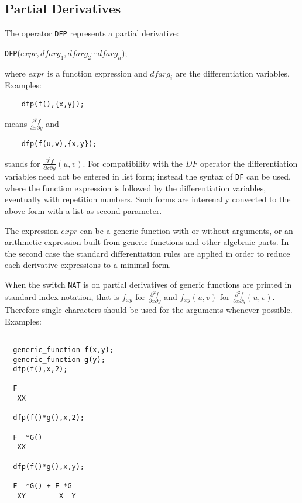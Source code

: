 \subsection{Partial Derivatives}

The operator {\tt DFP} represents a partial derivative:

\vspace{.1in}
 {\tt DFP}($expr,{dfarg_1,dfarg_2\cdots dfarg_n}$);
\vspace{.1in}

\noindent
where $expr$ is a function expression and $dfarg_i$ are
the differentiation variables. Examples:

\begin{verbatim}
    dfp(f(),{x,y});
\end{verbatim}
means $\frac{\partial ^2 f}{\partial x \partial y}$ and
\begin{verbatim}
    dfp(f(u,v),{x,y});
\end{verbatim}
stands for $\frac{\partial ^2 f}{\partial x \partial y} (u,v)$.
For compatibility with the $DF$ operator the differentiation
variables need not be entered in list form; instead the syntax
of {\tt DF} can be used, where the function expression is followed
by the differentiation variables, eventually with repetition
numbers. Such forms are interenally converted to the above
form with a list as second parameter.

The expression $expr$ can be a generic function
with or without arguments, or an arithmetic expression built
from generic functions and other algebraic parts. In the
second case the standard differentiation rules are applied
in order to reduce each derivative expressions to a minimal
form.

When the switch \texttt{NAT} is on partial derivatives of generic
functions are printed in standard index notation, that is
$f_{xy}$ for $\frac{\partial ^2 f}{\partial x \partial y}$
and $f_{xy}(u,v)$ for $\frac{\partial ^2 f}{\partial x \partial y}(u,v)$.
Therefore single characters should be used for the arguments
whenever possible. Examples:

\begin{verbatim}

  generic_function f(x,y);
  generic_function g(y);
  dfp(f(),x,2);

  F
   XX

  dfp(f()*g(),x,2);

  F  *G()
   XX

  dfp(f()*g(),x,y);

  F  *G() + F *G
   XY        X  Y

\end{verbatim}

